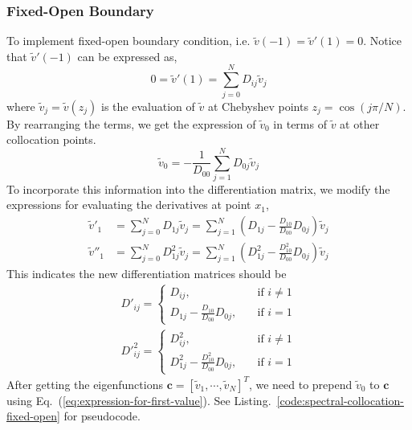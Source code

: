 \subsubsection*{Fixed-Open Boundary}
To implement fixed-open boundary condition, i.e. $\tilde{v}(-1)=\tilde{v}'(1)=0$. Notice that $\tilde{v}'(-1)$ can be expressed as,
\begin{equation}
	0 = \tilde{v}'(1) = \sum_{j=0}^{N}D_{ij}\tilde{v}_j
\end{equation}
where $\tilde{v}_j=\tilde{v}(z_j)$ is the evaluation of $\tilde{v}$ at Chebyshev points $z_j=\cos(j\pi/N)$. By rearranging the terms, we get the expression of $\tilde{v}_0$ in terms of $\tilde{v}$ at other collocation points.
\begin{equation}
	\tilde{v}_0 = -\frac{1}{D_{00}}\sum_{j=1}^{N} D_{0j}\tilde{v}_j
	\label{eq:expression-for-first-value}
\end{equation}
To incorporate this information into the differentiation matrix, we modify the expressions for evaluating the derivatives at point $x_1$,
\begin{align}
	\tilde{v}'_{1}  & = \sum_{j=0}^{N}D_{1j}\tilde{v}_j = \sum_{j=1}^{N}\left(D_{1j} - \frac{D_{10}}{D_{00}}D_{0j}\right)\tilde{v}_j       \\
	\tilde{v}''_{1} & = \sum_{j=0}^{N}D^2_{1j}\tilde{v}_j = \sum_{j=1}^{N}\left(D^2_{1j} - \frac{D^2_{10}}{D_{00}}D_{0j}\right)\tilde{v}_j
\end{align}
This indicates the new differentiation matrices should be
\begin{align}
	D'_{ij} = \begin{cases}
		          D_{ij}, \quad                               & \text{if $i\neq 1$} \\
		          D_{1j} - \frac{D_{10}}{D_{00}}D_{0j}, \quad & \text{if $i=1$}
	          \end{cases} \\
	D'^2_{ij} = \begin{cases}
		            D^2_{ij}, \quad                                 & \text{if $i\neq 1$} \\
		            D^2_{1j} - \frac{D^2_{10}}{D_{00}}D_{0j}, \quad & \text{if $i=1$}
	            \end{cases}
\end{align}
After getting the eigenfunctions $\mathbf{c} = [\tilde{v}_1, \cdots, \tilde{v}_N]^T$, we need to prepend $\tilde{v}_0$ to $\mathbf{c}$ using Eq.~(\ref{eq:expression-for-first-value}). See Listing.~\ref{code:spectral-collocation-fixed-open} for pseudocode.


